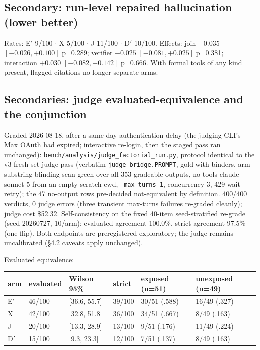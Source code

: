 \documentclass[10pt]{article}
\newcommand{\code}[1]{\texttt{#1}}
\begin{document}
\subsection{Secondary: run-level repaired hallucination (lower better)}

Rates: E$'$ 9/100 $\cdot$ X 5/100 $\cdot$ J 11/100 $\cdot$ D$'$
10/100. Effects: join $+0.035$ $[-0.026, +0.100]$ p=0.289; verifier
$-0.025$ $[-0.081, +0.025]$ p=0.381; interaction $+0.030$
$[-0.082, +0.142]$ p=0.666. With formal tools of any kind present,
flagged citations no longer separate arms.

\subsection{Secondaries: judge evaluated-equivalence and the conjunction}\label{s15judge}

Graded 2026-08-18, after a same-day authentication delay (the judging
CLI's Max OAuth had expired; interactive re-login, then the staged
pass ran unchanged): \code{bench/analysis/judge\_factorial\_run.py},
protocol identical to the v3 fresh-set judge pass (verbatim
\code{judge\_bridge.PROMPT}, gold with binders, arm-substring blinding
scan green over all 353 gradeable outputs, no-tools claude-sonnet-5
from an empty scratch cwd, \code{--max-turns 1}, concurrency 3, 429
wait-retry); the 47 no-output rows pre-decided not-equivalent by
definition. 400/400 verdicts, 0 judge errors (three transient
max-turns failures re-graded cleanly); judge cost \$52.32.
Self-consistency on the fixed 40-item seed-stratified re-grade (seed
20260727, 10/arm): evaluated agreement 100.0\%, strict agreement
97.5\% (one flip). Both endpoints are preregistered-exploratory; the
judge remains uncalibrated (\S 4.2 caveats apply unchanged).

Evaluated equivalence:

\begin{center}\footnotesize
\begin{tabular}{@{}llllll@{}}
\toprule
arm & evaluated & Wilson 95\% & strict & exposed (n=51) & unexposed (n=49) \\
\midrule
E$'$ & 46/100 & [36.6, 55.7] & 39/100 & 30/51 (.588) & 16/49 (.327) \\
X & 42/100 & [32.8, 51.8] & 36/100 & 34/51 (.667) & 8/49 (.163) \\
J & 20/100 & [13.3, 28.9] & 13/100 & 9/51 (.176) & 11/49 (.224) \\
D$'$ & 15/100 & [9.3, 23.3] & 12/100 & 7/51 (.137) & 8/49 (.163) \\
\bottomrule
\end{tabular}
\end{center}
\end{document}
